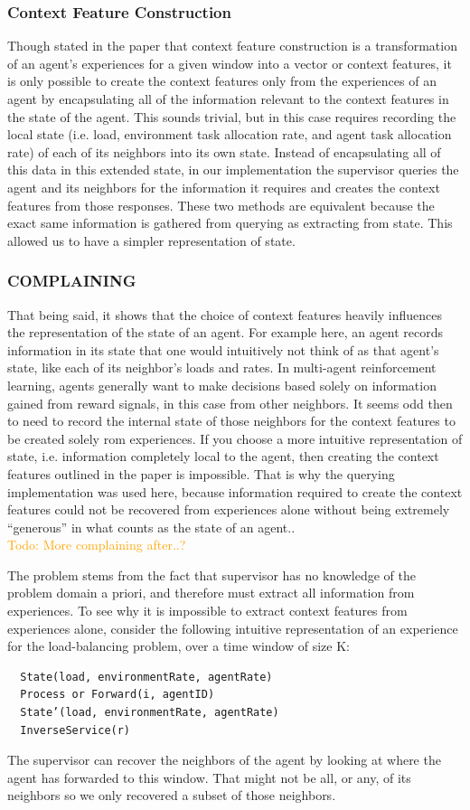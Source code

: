 \documentclass[letterpaper]{article}
\newcommand\todo[1]{\textcolor{orange}{Todo: #1}}
\begin{document}
\subsubsection{Context Feature Construction}
Though stated in the paper that context feature construction is a transformation of an agent’s experiences for a given window into a vector or context features, it is only possible to create the context features only from the experiences of an agent by encapsulating all of the information relevant to the context features in the state of the agent. This sounds trivial, but in this case requires recording the local state (i.e. load, environment task allocation rate, and agent task allocation rate) of each of its neighbors into its own state.  Instead of encapsulating all of this data in this extended state, in our implementation the supervisor queries the agent and its neighbors for the information it requires and creates the context features from those responses.  These two methods are equivalent because the exact same information is gathered from querying as extracting from state.  This allowed us to have a simpler representation of state.

\subsubsection{COMPLAINING}
That being said, it shows that the choice of context features heavily influences the representation of the state of an agent.  For example here, an agent records information in its state that one would intuitively not think of as that agent’s state, like each of its neighbor’s loads and rates.  In multi-agent reinforcement learning, agents generally want to make decisions based solely on information gained from reward signals, in this case from other neighbors.  It seems odd then to need to record the internal state of those neighbors for the context features to be created solely rom experiences.  If you choose a more intuitive representation of state, i.e. information completely local to the agent, then creating the context features outlined in the paper is impossible. That is why the querying implementation was used here, because information required to create the context features could not be recovered from experiences alone without being extremely “generous” in what counts as the state of an agent..
\\\todo{More complaining after..?}

The problem stems from the fact that supervisor has no knowledge of the problem domain a priori, and therefore must extract all information from experiences. To see why it is impossible to extract context features from experiences alone, consider the following intuitive representation of an experience for the load-balancing problem, over a time window of size K:
\begin{lstlisting}
  State(load, environmentRate, agentRate)
  Process or Forward(i, agentID)
  State’(load, environmentRate, agentRate)
  InverseService(r)
\end{lstlisting}
The supervisor can recover the neighbors of the agent by looking at where the agent has forwarded to this window.  That might not be all, or any, of its neighbors so we only recovered a subset of those neighbors.
\end{document}
